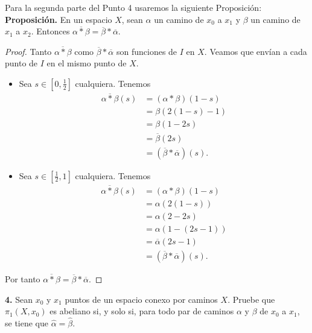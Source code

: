 Para la segunda parte del Punto 4 usaremos la siguiente Proposición:\\
\textbf{Proposición.} En un espacio $X$, sean $\alpha$ un camino de $x_0$ a $x_1$ y $\beta$ un camino de $x_1$ a $x_2$. Entonces $\overline{\alpha*\beta}=\overline{\beta}*\overline{\alpha}$.
\begin{proof}
   Tanto $\overline{\alpha*\beta}$ como $\overline{\beta}*\overline{\alpha}$ son funciones de $I$ en $X$. Veamos que envían a cada punto de $I$ en el mismo punto de $X$.
   \begin{itemize}
      \item Sea $s\in[0,\frac{1}{2}]$ cualquiera. Tenemos
         $$
         \begin{aligned}
            \overline{\alpha*\beta}(s) &= (\alpha*\beta)(1-s)\\
                                       &= \beta(2(1-s)-1)\\
                                       &= \beta(1-2s)\\
                                       &= \overline{\beta}(2s)\\
                                       &= (\overline{\beta}*\overline{\alpha})(s).
         \end{aligned}
         $$
      \item Sea $s\in[\frac{1}{2},1]$ cualquiera. Tenemos
         $$
         \begin{aligned}
            \overline{\alpha*\beta}(s) &= (\alpha*\beta)(1-s)\\
                                       &= \alpha(2(1-s))\\
                                       &= \alpha(2-2s)\\
                                       &= \alpha(1-(2s-1))\\
                                       &= \overline{\alpha}(2s-1)\\
                                       &= (\overline{\beta}*\overline{\alpha})(s).
         \end{aligned}
         $$
   \end{itemize}
   Por tanto $\overline{\alpha*\beta}=\overline{\beta}*\overline{\alpha}$.
\end{proof}
\textbf{4.} Sean $x_0$ y $x_1$ puntos de un espacio conexo por caminos $X$. Pruebe que $\pi_1(X,x_0)$ es abeliano si, y solo si, para todo par de caminos $\alpha$ y $\beta$ de $x_0$ a $x_1$, se tiene que $\widehat{\alpha}=\widehat{\beta}$.
